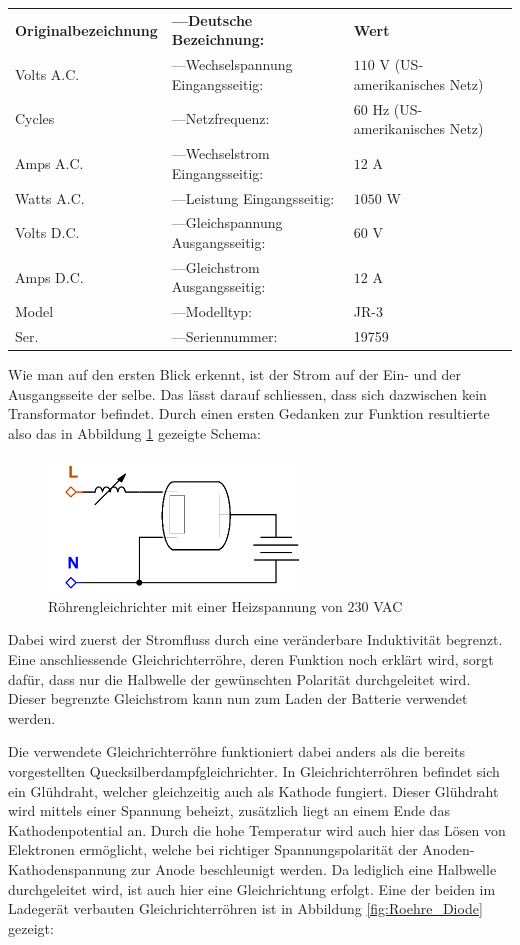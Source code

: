 \begin{tabular}{lll}
	\textbf{Originalbezeichnung} & \textbf{---\quad Deutsche Bezeichnung:} & \textbf{Wert} \\
	Volts A.C. & ---\quad Wechselspannung Eingangsseitig: & $110$ V (US-amerikanisches Netz) \\
	Cycles & ---\quad Netzfrequenz: & $60$ Hz (US-amerikanisches Netz)\\
	Amps A.C. & ---\quad Wechselstrom Eingangsseitig: & $12$ A \\
	Watts A.C. & ---\quad Leistung Eingangsseitig: & $1050$ W \\
	Volts D.C. & ---\quad Gleichspannung Ausgangsseitig: & $60$ V \\
	Amps D.C. & ---\quad Gleichstrom Ausgangsseitig: & $12$ A \\
	Model & ---\quad Modelltyp: & JR-3 \\
	Ser. & ---\quad Seriennummer: & 19759
\end{tabular}

Wie man auf den ersten Blick erkennt, ist der Strom auf der Ein- und der Ausgangsseite der selbe. Das lässt darauf schliessen, dass sich dazwischen kein Transformator befindet. Durch einen ersten Gedanken zur Funktion resultierte also das in Abbildung \ref{fig:Ladegeraet1} gezeigte Schema:

\begin{figure}[h]
	\centering
		\includegraphics[width=0.60\textwidth]{images/Ladegeraet_Alt_1.PNG}
	\caption{Röhrengleichrichter mit einer Heizspannung von $230$ VAC}
	\label{fig:Ladegeraet1}
\end{figure}

Dabei wird zuerst der Stromfluss durch eine veränderbare Induktivität begrenzt. Eine anschliessende Gleichrichterröhre, deren Funktion noch erklärt wird, sorgt dafür, dass nur die Halbwelle der gewünschten Polarität durchgeleitet wird. Dieser begrenzte Gleichstrom kann nun zum Laden der Batterie verwendet werden.

Die verwendete Gleichrichterröhre funktioniert dabei anders als die bereits vorgestellten Quecksilberdampfgleichrichter. In Gleichrichterröhren befindet sich ein Glühdraht, welcher gleichzeitig auch als Kathode fungiert. Dieser Glühdraht wird mittels einer Spannung beheizt, zusätzlich liegt an einem Ende das Kathodenpotential an. Durch die hohe Temperatur wird auch hier das Lösen von Elektronen ermöglicht, welche bei richtiger Spannungspolarität der Anoden-Kathodenspannung zur Anode beschleunigt werden. Da lediglich eine Halbwelle durchgeleitet wird, ist auch hier eine Gleichrichtung erfolgt. Eine der beiden im Ladegerät verbauten Gleichrichterröhren ist in Abbildung \ref{fig:Roehre_Diode} gezeigt: \newpage


